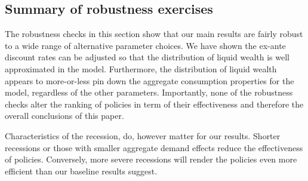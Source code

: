 \documentclass[../HAFiscal]{subfiles}
\begin{document}
\FloatBarrier
\subsection{Summary of robustness exercises}
\label{sec:robust_summary}

The robustness checks in this section show that our main results are fairly robust to a wide range of alternative parameter choices. We have shown the ex-ante discount rates can be adjusted so that the distribution of liquid wealth is well approximated in the model.  Furthermore, the distribution of liquid wealth appears to more-or-less pin down the aggregate consumption properties for the model, regardless of the other parameters. Importantly, none of the robustness checks alter the ranking of policies in term of their effectiveness and therefore the overall conclusions of this paper.

Characteristics of the recession, do, however matter for our results. Shorter recessions or those with smaller aggregate demand effects reduce the effectiveness of policies. Conversely, more severe recessions will render the policies even more efficient than our baseline results suggest.
\end{document}
